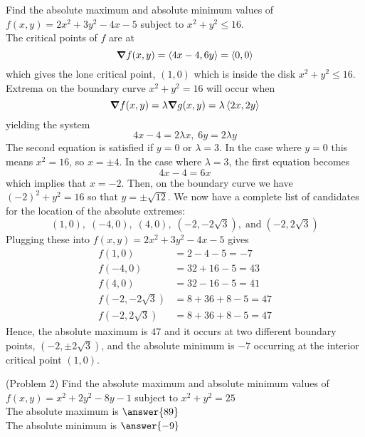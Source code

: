 \documentclass[handout]{ximera}
\begin{document}
\begin{example}[Example 2]
Find the absolute maximum and absolute minimum values of $f(x,y) = 2x^2 + 3y^2 - 4x - 5$ subject to $x^2 + y^2 \leq 16$.\\
The critical points of $f$ are at
\[
\boldsymbol\nabla f(x,y) = \left\langle 4x -4, 6y\right\rangle = \left\langle 0,0\right\rangle
\]
 which gives the lone critical point, $(1,0)$ which is inside the disk $x^2 + y^2 \leq 16$.\\
 Extrema on the boundary curve $x^2 + y^2 = 16$ will occur when
 \[
 \boldsymbol\nabla f(x,y) = \lambda \boldsymbol\nabla g(x,y) = \lambda \left\langle 2x, 2y\right\rangle
 \]
 yielding the system
 \[
 4x - 4 = 2\lambda x, \; 6y = 2\lambda y
 \]
 The second equation is satisfied if $y = 0$ or $\lambda = 3$.  In the case where $y = 0$ this means $x^2 = 16$, so $x = \pm 4$.
 In the case where $\lambda = 3$, the first equation becomes
 \[
 4x - 4 = 6x 
 \]
 which implies that $x = -2$.  Then, on the boundary curve we have $(-2)^2 + y^2 = 16$ so that $y = \pm \sqrt{12}$.
 We now have a complete list of candidates for the location of the absolute extremes:
 \[
 (1,0), \; (-4, 0), \; (4,0), \; (-2, -2\sqrt3), \;\text{and} \; (-2, 2\sqrt 3)
 \]
 Plugging these into $f(x,y) = 2x^2 + 3y^2 - 4x - 5$ gives
 \begin{align*}
 f(1,0) &= 2-4-5=-7\\
 f(-4, 0) &= 32 +16 -5 = 43\\
 f(4, 0) &= 32 -16 -5 = 41\\
 f(-2, -2\sqrt3) &= 8 + 36 +8-5 = 47\\
 f(-2, 2\sqrt3) &= 8 + 36 +8-5 = 47
 \end{align*}
 Hence, the absolute maximum is $47$ and it occurs at two different boundary points, $(-2, \pm 2\sqrt 3)$,
 and the absolute minimum is $-7$ occurring at the interior critical point $(1,0)$.
 
 
\end{example}

\begin{problem}(Problem 2)
Find the absolute maximum and absolute minimum values of $f(x,y) = x^2 + 2y^2 - 8y - 1$ subject to $x^2 + y^2 = 25$\\
The absolute maximum is $\answer{89}$\\
The absolute minimum is $\answer{-9}$
\end{problem}
\end{document}
